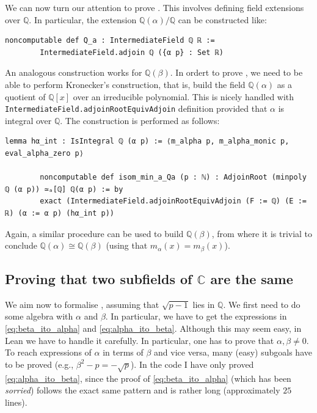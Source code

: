 \documentclass[a4paper,11pt]{article}
\theoremstyle{plain}
\newcommand{\Q}{\ensuremath{\mathbb{Q}}} %
\newcommand{\C}{\ensuremath{\mathbb{C}}} %
\begin{document}
	We can now turn our attention to prove . This involves defining field extensions over $\Q$. In particular, the extension $\Q(\alpha)/\Q$ can be constructed like:\\
	
	\begin{lstlisting}[caption={Defining the extension $\Q(\alpha)/\Q$.}, label={list:2}]
		noncomputable def Q_a : IntermediateField ℚ ℝ :=
		IntermediateField.adjoin ℚ ({α p} : Set ℝ) 
	\end{lstlisting}
	
	An analogous construction works for $\Q(\beta)$. In ordert to prove , we need to be able to perform Kronecker's construction, that is, build the field $\Q(\alpha)$ as a quotient of $\Q[x]$ over an irreducible polynomial. This is nicely handled with \lstinline|IntermediateField.adjoinRootEquivAdjoin| definition provided that $\alpha$ is integral over $\Q$. The construction is performed as follows:\\
	
	\begin{lstlisting}[caption={Defining the field \ensuremath{\mathbb{Q}(\alpha)\cong\mathbb{Q}[x]/(m_\alpha(x))}.}, label={list:3}]
		lemma hα_int : IsIntegral ℚ (α p) := ⟨m_alpha p, m_alpha_monic p, eval_alpha_zero p⟩
		
		noncomputable def isom_min_a_Qa (p : ℕ) : AdjoinRoot (minpoly ℚ (α p)) ≃ₐ[ℚ] ℚ(α p) := by
		exact (IntermediateField.adjoinRootEquivAdjoin (F := ℚ) (E := ℝ) (α := α p) (hα_int p)) 
	\end{lstlisting}
	
	Again, a similar procedure can be used to build $\Q(\beta)$, from where it is trivial to conclude $\Q(\alpha)\cong\Q(\beta)$ (using that $m_\alpha(x)=m_\beta(x)$).

	\subsection{Proving that two subfields of $\C$ are the same}
	
	We aim now to formalise , assuming that $\sqrt{p-1}$ lies in $\Q$. We first need to do some algebra with $\alpha$ and $\beta$. In particular, we have to get the expressions in \cref{eq:beta_ito_alpha} and \cref{eq:alpha_ito_beta}. Although this may seem easy, in Lean we have to handle it carefully. In particular, one has to prove that $\alpha,\beta\neq 0$. To reach expressions of $\alpha$ in terms of $\beta$ and vice versa, many (easy) subgoals have to be proved (e.g., $\beta^2-p=-\sqrt{p}$). In the code I have only proved \cref{eq:alpha_ito_beta}, since the proof of \cref{eq:beta_ito_alpha} (which has been \emph{sorried}) follows the exact same pattern and is rather long (approximately $25$ lines).
	
\end{document}
